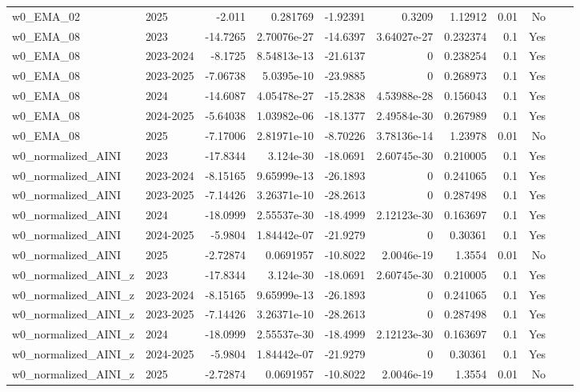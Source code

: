 \begin{longtable}{llrrrrrrrrl}
w0\_EMA\_02 & 2025 & -2.011 & 0.281769 & -1.92391 & 0.3209 & 1.12912 & 0.01 & No &  \\
w0\_EMA\_08 & 2023 & -14.7265 & 2.70076e-27 & -14.6397 & 3.64027e-27 & 0.232374 & 0.1 & Yes &  \\
w0\_EMA\_08 & 2023-2024 & -8.1725 & 8.54813e-13 & -21.6137 & 0 & 0.238254 & 0.1 & Yes &  \\
w0\_EMA\_08 & 2023-2025 & -7.06738 & 5.0395e-10 & -23.9885 & 0 & 0.268973 & 0.1 & Yes &  \\
w0\_EMA\_08 & 2024 & -14.6087 & 4.05478e-27 & -15.2838 & 4.53988e-28 & 0.156043 & 0.1 & Yes &  \\
w0\_EMA\_08 & 2024-2025 & -5.64038 & 1.03982e-06 & -18.1377 & 2.49584e-30 & 0.267989 & 0.1 & Yes &  \\
w0\_EMA\_08 & 2025 & -7.17006 & 2.81971e-10 & -8.70226 & 3.78136e-14 & 1.23978 & 0.01 & No &  \\
w0\_normalized\_AINI & 2023 & -17.8344 & 3.124e-30 & -18.0691 & 2.60745e-30 & 0.210005 & 0.1 & Yes &  \\
w0\_normalized\_AINI & 2023-2024 & -8.15165 & 9.65999e-13 & -26.1893 & 0 & 0.241065 & 0.1 & Yes &  \\
w0\_normalized\_AINI & 2023-2025 & -7.14426 & 3.26371e-10 & -28.2613 & 0 & 0.287498 & 0.1 & Yes &  \\
w0\_normalized\_AINI & 2024 & -18.0999 & 2.55537e-30 & -18.4999 & 2.12123e-30 & 0.163697 & 0.1 & Yes &  \\
w0\_normalized\_AINI & 2024-2025 & -5.9804 & 1.84442e-07 & -21.9279 & 0 & 0.30361 & 0.1 & Yes &  \\
w0\_normalized\_AINI & 2025 & -2.72874 & 0.0691957 & -10.8022 & 2.0046e-19 & 1.3554 & 0.01 & No &  \\
w0\_normalized\_AINI\_z & 2023 & -17.8344 & 3.124e-30 & -18.0691 & 2.60745e-30 & 0.210005 & 0.1 & Yes &  \\
w0\_normalized\_AINI\_z & 2023-2024 & -8.15165 & 9.65999e-13 & -26.1893 & 0 & 0.241065 & 0.1 & Yes &  \\
w0\_normalized\_AINI\_z & 2023-2025 & -7.14426 & 3.26371e-10 & -28.2613 & 0 & 0.287498 & 0.1 & Yes &  \\
w0\_normalized\_AINI\_z & 2024 & -18.0999 & 2.55537e-30 & -18.4999 & 2.12123e-30 & 0.163697 & 0.1 & Yes &  \\
w0\_normalized\_AINI\_z & 2024-2025 & -5.9804 & 1.84442e-07 & -21.9279 & 0 & 0.30361 & 0.1 & Yes &  \\
w0\_normalized\_AINI\_z & 2025 & -2.72874 & 0.0691957 & -10.8022 & 2.0046e-19 & 1.3554 & 0.01 & No &  \\

\end{longtable}
